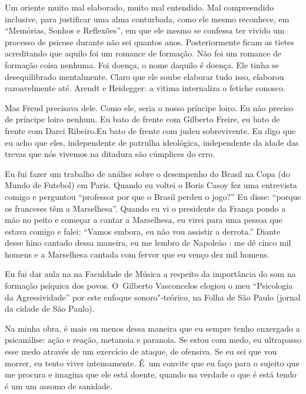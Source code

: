  

Um oriente muito mal elaborado, muito mal entendido. Mal compreendido
inclusive, para justificar uma alma conturbada, como ele mesmo
reconhece, em ``Memórias, Sonhos e Reflexões'', em que ele mesmo se
confessa ter vivido um processo de psicose durante não sei quantos anos.
Posteriormente ficam as tietes acreditando que aquilo foi um romance de
formação. Não foi um romance de formação coisa nenhuma. Foi doença, o
nome daquilo é doença. Ele tinha se desequilibrado mentalmente. Claro
que ele soube elaborar tudo isso, elaborou razoavelmente até. Arendt e
Heidegger: a vitima internaliza o fetiche conosco.

 

Mas Freud precisava dele. Como ele, seria o nosso príncipe loiro. Eu não
preciso de príncipe loiro nenhum. Eu bato de frente com Gilberto Freire,
eu bato de frente com Darci Ribeiro.Eu bato de frente com judeu
sobrevivente. Eu digo que eu acho que eles, independente de patrulha
ideológica, independente da idade das trevas que nós vivemos na ditadura
são cúmplices do erro.

 

Eu fui fazer um trabalho de análise sobre o desempenho do Brasil na Copa
(do Mundo de Futebol) em Paris. Quando eu voltei o Boris Casoy fez uma
entrevista comigo e perguntou ``professor por que o Brasil perdeu o
jogo?'' Eu disse: ``porque os franceses têm a Marselhesa''. Quando eu vi
o presidente da França pondo a mão no peito e começar a cantar a
Marselhesa, eu virei para uma pessoa que estava comigo e falei: ``Vamos
embora, eu não vou assistir a derrota.'' Diante desse hino cantado dessa
maneira, eu me lembro de Napoleão : me dê cinco mil homens e a
Marselhesa cantada com fervor que eu venço dez mil homens.

 

Eu fui dar aula na  na Faculdade de Música a respeito da importância
do som na formação psíquica dos povos. O~Gilberto Vasconcelos elogiou o
meu ``Psicologia da Agressividade'' por este enfoque sonoro"-teórico, na
Folha de São Paulo (jornal da cidade de São Paulo).

 

Na minha obra, é mais ou menos dessa maneira que eu sempre tenho
enxergado a psicanálise: ação e reação, metanoia e paranoia. Se estou
com medo, eu ultrapasso esse medo através de um exercício de ataque, de
ofensiva. Se eu sei que vou morrer, eu tento viver intensamente. É~um
convite que eu faço para o sujeito que me procura e imagina que ele está
doente, quando na verdade o que é está tendo é um um assomo de sanidade.

